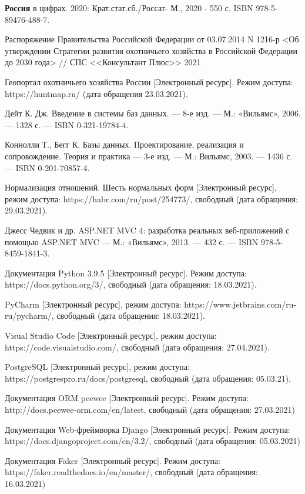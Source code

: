 \newpage
	\begin{thebibliography}{9} 
		
		 \textbf{Россия} в цифрах. 2020: Крат.стат.сб./Россат- М., 2020 - 550 с. ISBN 978-5-89476-488-7.
		
		 Распоряжение Правительства Российской Федерации от 03.07.2014 N 1216-р <Об утверждении Стратегии развития охотничьего хозяйства в Российской Федерации до 2030 года> // СПС <<Консультант Плюс>> 2021 
		
		 Геопортал охотничьего хозяйства России [Электронный ресурс]. Режим доступа: https://huntmap.ru/ (дата обращения 23.03.2021).
		
		 Дейт К. Дж. Введение в системы баз данных. — 8-е изд. — М.: «Вильямс», 2006. — 1328 с. — ISBN 0-321-19784-4.
		
		 Коннолли Т., Бегг К. Базы данных. Проектирование, реализация и сопровождение. Теория и практика — 3-е изд. — М.: Вильямс, 2003. — 1436 с. — ISBN 0-201-70857-4.
		
		 Нормализация отношений. Шесть нормальных форм [Электронный ресурс], режим доступа: https://habr.com/ru/post/254773/, свободный (дата обращения: 29.03.2021).
		
		 Джесс Чедвик и др. ASP.NET MVC 4: разработка реальных веб-приложений с помощью ASP.NET MVC — М.: «Вильямс», 2013. — 432 с. — ISBN 978-5-8459-1841-3.
		
		 Документация Python 3.9.5 [Электронный ресурс]. Режим доступа: https://docs.python.org/3/, свободный (дата обращения: 18.03.2021).

		
		 PyCharm [Электронный ресурс], режим доступа: https://www.jetbrains.com/ru-ru/pycharm/, свободный (дата обращения:
		18.03.2021).
		
		 Visual Studio Code [Электронный ресурс], режим доступа: https://code.visualstudio.com/, свободный (дата обращения: 27.04.2021).
		
		 PostgreSQL [Электронный ресурс], режим доступа: https://postgrespro.ru/docs/postgresql, свободный (дата обращения: 05.03.21).
		
		 Документация ORM peewee [Электронный ресурс]. Режим доступа: http://docs.peewee-orm.com/en/latest, свободный (дата обращения: 27.03.2021)
		
		 Документация Web-фреймворка Django [Электронный ресурс]. Режим доступа: https://docs.djangoproject.com/en/3.2/, свободный (дата обращения: 05.03.2021)
		
		 Документация Faker [Электронный ресурс]. Режим доступа: https://faker.readthedocs.io/en/master/, свободный (дата обращения: 16.03.2021)
		
		
		
	\end{thebibliography}
